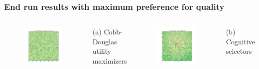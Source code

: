 \documentclass{beamer}
\begin{document}
\begin{frame}
\frametitle{End run results with maximum preference for quality}

\begin{columns}[t] %

\begin{figure}
\includegraphics[width=0.9\linewidth]{qual_cd_0_0.png}
\end{figure}
(a) Cobb-Douglas utility maximizers

\begin{figure}
\includegraphics[width=0.9\linewidth]{qual_cog2_0_0.png}
\end{figure}
(b) Cognitive selectors

\end{columns}
\end{frame}
\end{document}
